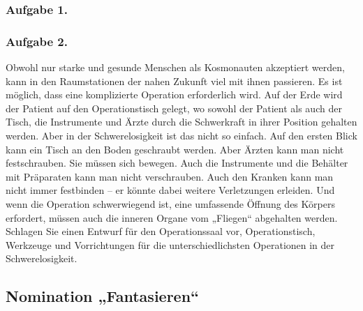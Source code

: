 \documentclass[11pt,a4paper]{article}
\begin{document}
\newcommand{\CosmicOperation}{Obwohl nur starke und gesunde Menschen als
  Kosmonauten akzeptiert werden, kann in den Raumstationen der nahen Zukunft
  viel mit ihnen passieren. Es ist möglich, dass eine komplizierte Operation
  erforderlich wird. Auf der Erde wird der Patient auf den Operationstisch
  gelegt, wo sowohl der Patient als auch der Tisch, die Instrumente und Ärzte
  durch die Schwerkraft in ihrer Position gehalten werden. Aber in der
  Schwerelosigkeit ist das nicht so einfach. Auf den ersten Blick kann ein
  Tisch an den Boden geschraubt werden. Aber Ärzten kann man nicht
  festschrauben. Sie müssen sich bewegen. Auch die Instrumente und die
  Behälter mit Präparaten kann man nicht verschrauben. Auch den Kranken kann
  man nicht immer festbinden -- er könnte dabei weitere Verletzungen erleiden.
  Und wenn die Operation schwerwiegend ist, eine umfassende Öffnung des
  Körpers erfordert, müssen auch die inneren Organe vom „Fliegen“ abgehalten
  werden.  Schlagen Sie einen Entwurf für den Operationssaal vor,
  Operationstisch, Werkzeuge und Vorrichtungen für die unterschiedlichsten
  Operationen in der Schwerelosigkeit.}

\subsubsection*{Aufgabe 1.}\Aberration
\subsubsection*{Aufgabe 2.}\CosmicOperation

\subsection{Nomination „Fantasieren“}
\end{document}
